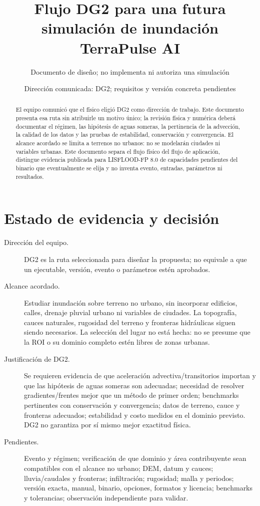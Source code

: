 \documentclass[11pt,a4paper]{article}
\title{Flujo DG2 para una futura simulación de inundación\\\large TerraPulse AI}
\author{Documento de diseño; no implementa ni autoriza una simulación}
\date{Dirección comunicada: DG2; requisitos y versión concreta pendientes}
\begin{document}
\maketitle
\begin{abstract}
El equipo comunicó que el físico eligió DG2 como dirección de trabajo. Este documento presenta esa ruta sin atribuirle un motivo único; la revisión física y numérica deberá documentar el régimen, las hipótesis de aguas someras, la pertinencia de la advección, la calidad de los datos y las pruebas de estabilidad, conservación y convergencia. El alcance acordado se limita a terrenos no urbanos: no se modelarán ciudades ni variables urbanas. Este documento separa el flujo físico del flujo de aplicación, distingue evidencia publicada para LISFLOOD-FP 8.0 de capacidades pendientes del binario que eventualmente se elija y no inventa evento, entradas, parámetros ni resultados.
\end{abstract}
\tableofcontents\newpage

\section{Estado de evidencia y decisión}
\begin{description}
\item[Dirección del equipo.] DG2 es la ruta seleccionada para diseñar la propuesta; no equivale a que un ejecutable, versión, evento o parámetros estén aprobados.
\item[Alcance acordado.] Estudiar inundación sobre terreno no urbano, sin incorporar edificios, calles, drenaje pluvial urbano ni variables de ciudades. La topografía, cauces naturales, rugosidad del terreno y fronteras hidráulicas siguen siendo necesarios. La selección del lugar no está hecha: no se presume que la ROI o su dominio completo estén libres de zonas urbanas.
\item[Justificación de DG2.] Se requieren evidencia de que aceleración advectiva/transitorios importan y que las hipótesis de aguas someras son adecuadas; necesidad de resolver gradientes/frentes mejor que un método de primer orden; benchmarks pertinentes con conservación y convergencia; datos de terreno, cauce y fronteras adecuados; estabilidad y costo medidos en el dominio previsto. DG2 no garantiza por sí mismo mejor exactitud física.
\item[Pendientes.] Evento y régimen; verificación de que dominio y área contribuyente sean compatibles con el alcance no urbano; DEM, datum y cauces; lluvia/caudales y fronteras; infiltración; rugosidad; malla y periodos; versión exacta, manual, binario, opciones, formatos y licencia; benchmarks y tolerancias; observación independiente para validar.
\end{description}
\end{document}
